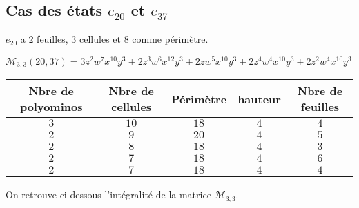 \documentclass[12pt]{memoireuqam1.3}
\begin{document}
\subsection*{Cas des états $e_{20}$ et $e_{37}$ }
$e_{20}$ a $2$ feuilles, $3$ cellules et $8$ comme périmètre.

$\mathcal{M}_{3,3}(20,37)=3z^2w^7x^{10}y^3+2z^3w^6x^{12}y^3+2zw^5x^{10}y^3+2z^4w^4x^{10}y^3+2z^2w^4x^{10}y^3$\\
\begin{tabular}{|c|c|c|c|c|}
 \hline
  Nbre de polyominos & Nbre de cellules & Périmètre & hauteur &Nbre de feuilles\\
 \hline
 $3$ & $10$ & $18$ & $4$ &$4$\\
 \hline
 $2$ & $9$ & $20$ & $4$ &$5$\\
 \hline
 $2$ & $8$ & $18$ & $4$ &$3$\\
 \hline
 $2$ & $7$ & $18$ & $4$ &$6$\\
 \hline
 $2$ & $7$ & $18$ & $4$ &$4$\\
 \hline
\end{tabular}

On retrouve ci-dessous l'intégralité de la matrice $\mathcal{M}_{3,3}$.
\end{document}
